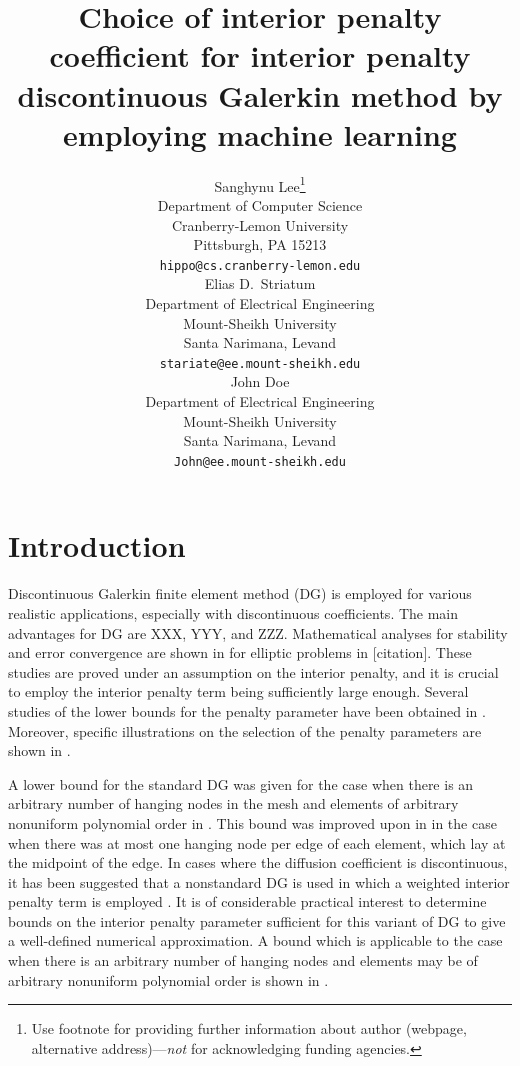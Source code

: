 \documentclass{article}
\title{Choice of interior penalty coefficient for interior penalty discontinuous Galerkin method by employing machine learning}
\author{
  Sanghynu Lee\thanks{Use footnote for providing further
    information about author (webpage, alternative
    address)---\emph{not} for acknowledging funding agencies.} \\
  Department of Computer Science\\
  Cranberry-Lemon University\\
  Pittsburgh, PA 15213 \\
  \texttt{hippo@cs.cranberry-lemon.edu} \\
   \And
 Elias D.~Striatum \\
  Department of Electrical Engineering\\
  Mount-Sheikh University\\
  Santa Narimana, Levand \\
  \texttt{stariate@ee.mount-sheikh.edu} \\
  \And
 John Doe \\
  Department of Electrical Engineering\\
  Mount-Sheikh University\\
  Santa Narimana, Levand \\
  \texttt{John@ee.mount-sheikh.edu} \\
}
\begin{document}
\maketitle

\begin{abstract}
\lipsum[1]
\end{abstract}




\section{Introduction}

Discontinuous Galerkin finite element method (DG) is employed for various realistic applications, especially with discontinuous coefficients. The main advantages for DG are XXX, YYY, and ZZZ. Mathematical analyses for stability and error convergence are shown in for elliptic problems in [citation]. 
These studies are proved under an assumption on the interior penalty, and it is   crucial to employ the interior penalty term being sufficiently large enough. 
Several studies of the lower bounds for the penalty parameter have been obtained in \cite{ainsworth2007posteriori,ainsworth2010fully,ainsworth2009constant,epshteyn2007estimation,shahbazi2005explicit}. Moreover, specific illustrations on the selection of the penalty parameters are shown in \cite{ainsworth2012note}.


A lower bound for the standard DG was given for the case when there is an arbitrary number of hanging nodes in the mesh and elements of arbitrary nonuniform polynomial order in \cite{shahbazi2005explicit}.
This bound was improved upon in \cite{ainsworth2009constant} in the case when there was at most one hanging node per edge of each element, which lay at the midpoint of the edge. 
In cases where the diffusion coefficient is discontinuous, it has been suggested that a nonstandard DG is used in which a weighted interior penalty term is employed \cite{ern2008posteriori,ern2009discontinuous}. 
It is of considerable practical interest to
determine bounds on the interior penalty parameter sufficient for this variant of DG to give
a well-defined numerical approximation. 
A bound which is
applicable to the case when there is an arbitrary number of hanging nodes and elements may be of arbitrary nonuniform polynomial order is shown in  \cite{ainsworth2012note}.
\end{document}
